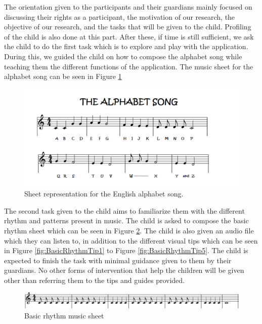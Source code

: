 The orientation given to the participants and their guardians mainly focused on discussing their rights as a participant, the motivation of our research, the objective of our research, and the tasks that will be given to the child. Profiling of the child is also done at this part. After these, if time is still sufficient, we ask the child to do the first task which is to explore and play with the application. During this, we guided the child on how to compose the alphabet song while teaching them the different functions of the application. The music sheet for the alphabet song can be seen in Figure \ref{fig:AlphabetMusicSheet}
\begin{figure}[H]
    \centering
    \includegraphics[width=12cm]{figures/NewFigures/alphabetsongmusicsheet.png}
    \caption{Sheet representation for the English alphabet song.}
    \label{fig:AlphabetMusicSheet}
\end{figure}
The second task given to the child aims to familiarize them with the different rhythm and patterns present in music. The child is asked to compose the basic rhythm sheet which can be seen in Figure \ref{fig:BasicRhythmMusicSheet}. The child is also given an audio file which they can listen to, in addition to the different visual tips which can be seen in Figure \ref{fig:BasicRhythmTip1} to Figure \ref{fig:BasicRhythmTip5}. The child is expected to finish the task with minimal guidance given to them by their guardians. No other forms of intervention that help the children will be given other than referring them to the tips and guides provided. 

\begin{figure}[H]
    \centering
    \includegraphics[width=16cm]{figures/NewFigures/BasicRhythmMusicSheet.png}
    \caption{Basic rhythm music sheet}
    \label{fig:BasicRhythmMusicSheet}
\end{figure}

